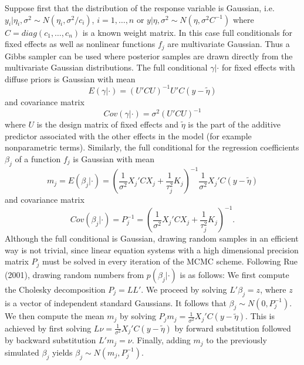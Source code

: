 \documentclass[11pt,a4paper,twoside]{bayesxarticle}
\begin{document}
Suppose first that the distribution of the response variable is
Gaussian, i.e. $y_i | \eta_i, \sigma^2 \sim
N(\eta_i,\sigma^2/c_i)$, $i=1,\dots,n$ or $y | \eta, \sigma^2 \sim
N(\eta,\sigma^2 C^{-1})$ where $C = diag(c_1,\dots,c_n)$ is a
known weight matrix.
 In this case full conditionals for fixed effects
as well as nonlinear functions $f_j$ are multivariate Gaussian.
Thus a Gibbs sampler can be used where posterior samples are drawn
directly from the multivariate Gaussian distributions. The full
conditional $\gamma | \cdot$ for fixed effects  with diffuse
priors is Gaussian with mean
\begin{equation}
\label{meanfixed} E(\gamma | \cdot) = (U'C
U)^{-1}U'C(y-\tilde{\eta} )
\end{equation}
and covariance matrix
\begin{equation}
\label{covfixed} Cov(\gamma | \cdot ) = \sigma^2 (U'CU)^{-1}
\end{equation}
where $U$ is the design matrix of fixed effects and $\tilde{\eta}$
is the part of the additive predictor associated with the other
effects in the model (for example nonparametric terms). Similarly,
the full conditional for the regression coefficients $\beta_j$ of
a function $f_j$ is Gaussian with mean
\begin{equation}
\label{meangaussian} m_j = E(\beta_j | \cdot) = \left(
\frac{1}{\sigma^2} X_j' C X_j + \frac{1}{\tau_j^2} K_j
\right)^{-1} \frac{1}{\sigma^2}X_j'C(y-\tilde{\eta})
\end{equation}
and covariance matrix
\begin{equation}
\label{covgaussian} Cov(\beta_j | \cdot) = P_j^{-1} = \left(
\frac{1}{\sigma^2} X_j'CX_j + \frac{1}{\tau_j^2} K_j \right)^{-1}.
\end{equation}
Although the full conditional is Gaussian, drawing random samples
in an efficient way is not trivial, since linear equation systems
with a high dimensional precision matrix $P_j$ must be solved in
every iteration of the MCMC scheme. Following Rue (2001), drawing
random numbers from $p(\beta_j | \cdot)$ is as follows: We first
compute the Cholesky decomposition $P_j = L L'$. We proceed by
solving $L' \beta_j = z$, where $z$ is a vector of independent
standard Gaussians. It follows that $\beta_j \sim N(0,P_j^{-1})$.
We then compute the mean $m_j$ by solving $P_j m_j =
\frac{1}{\sigma^2} X_j'C(y-\tilde{\eta})$. This is achieved by
first solving $L \nu = \frac{1}{\sigma^2} X_j'C(y-\tilde{\eta})$
by forward substitution followed by backward substitution $L' m_j
= \nu$. Finally, adding $m_j$ to the previously simulated
$\beta_j$ yields $\beta_j \sim N(m_j,P_j^{-1})$.
\end{document}
